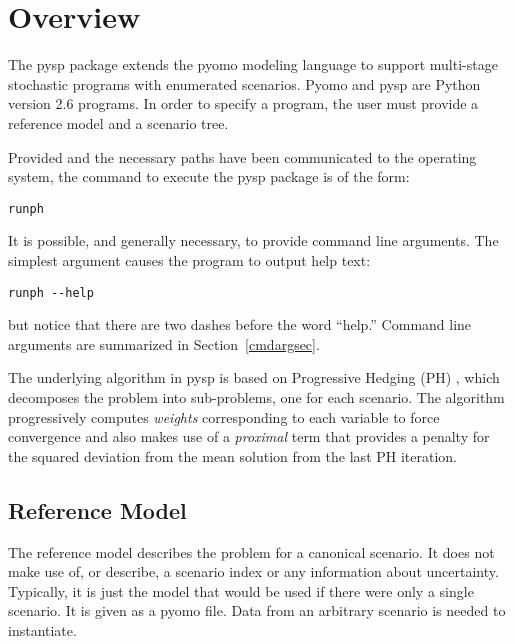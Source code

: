 \def\Argmax{\mathop{\rm argmax}}
\newcommand{\xBar}{\Vector{\overline{x}}}
\newcommand{\Bar}[1]{\overline{#1}}
\newcommand{\Prl}{\mbox{Pr}(\ell)}

\newcommand{\Vector}[1]{\mbox{{\boldmath $#1$}}}
\newcommand{\Matrix}[1]{\mbox{{\boldmath $#1$}}}
\newcommand{\VectLen}[1]{\mid\Vector{#1}\mid}
\newcommand{\Rint}[1]{\int_{#1}^{\infty}}
\newcommand{\Size}[1]{\mid #1 \mid}
\newcommand{\Floor}[1]{\lfloor #1 \rfloor}
\newcommand{\Ceil}[1]{\left\lceil #1 \right\rceil}

\section{Overview}

The pysp package extends the pyomo modeling language to support multi-stage stochastic programs with
enumerated scenarios. Pyomo and pysp are Python version 2.6 programs.  In order to
specify a program, the user must provide a reference model and a scenario tree. 

Provided and the necessary paths have been communicated to the operating system, the command to execute the pysp package is
of the form:
\begin{verbatim}
runph
\end{verbatim}
It is possible,
and generally necessary, to provide command line arguments. The simplest argument causes the program to output help text:
\begin{verbatim}
runph --help
\end{verbatim}
but notice that there are two dashes before the word ``help.'' Command line arguments are summarized in Section~\ref{cmdargsec}. 

The underlying algorithm in pysp
is based on Progressive Hedging (PH) \cite{RockafellarWets}, which decomposes the problem into sub-problems, one for
each scenario.
The algorithm progressively computes {\em weights} corresponding to each variable to force convergence
and also makes use of a {\em proximal} term that provides a penalty for the squared deviation from the
mean solution from the last PH iteration.

\subsection{Reference Model}

The reference model describes the problem for a canonical scenario. It does not make use of, or describe, a scenario index or any information about uncertainty. Typically, it is just the model that would be used if there were only a single scenario. It is given as a pyomo file. Data from an arbitrary scenario is needed to instantiate.

